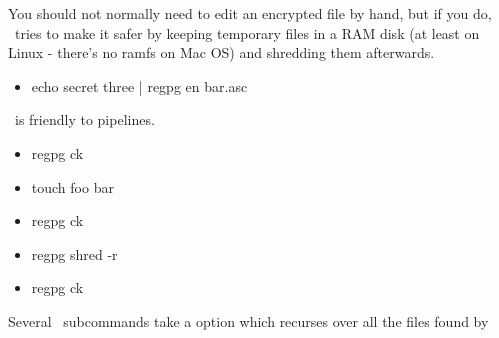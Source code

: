 {  You should not normally need to edit an encrypted file by hand, but
  if you do, \regpg\ tries to make it safer by keeping temporary files
  in a RAM disk (at least on Linux - there's no ramfs on Mac OS) and
  shredding them afterwards.

  \begin{itemize}
  \item echo secret three | regpg en bar.asc
  \end{itemize}

  \regpg\ is friendly to pipelines.

  \begin{itemize}
  \item regpg ck
  \item touch foo bar
  \item regpg ck
  \item regpg shred -r
  \item regpg ck
  \end{itemize}

  Several \regpg\ subcommands take a  option which recurses
  over all the files found by 

}



